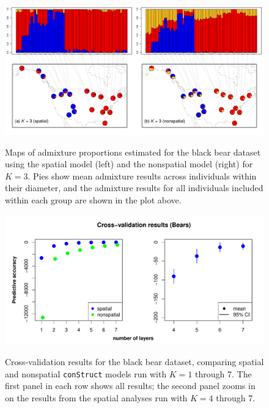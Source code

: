 \documentclass[10pt,letterpaper]{article}
\begin{document}
\begin{figure}
	\centering
		{\includegraphics[width=\textwidth]{figs/bears/bears_sp_vs_nsp.pdf}}
	\caption{
	Maps of admixture proportions estimated for the black bear dataset 
	using the spatial model (left) and the nonspatial model (right) for $K=3$.
	Pies show mean admixture results across individuals within their diameter, 
	and the admixture results for all individuals included within each group are 
	shown in the plot above.
    }\label{bear_K3}
\end{figure}

\begin{figure}
	\centering
		{\includegraphics[width=\textwidth]{figs/bears/bear_std_xval.pdf}}
	\caption{
	Cross-validation results for the black bear dataset,
	comparing spatial and nonspatial \texttt{conStruct} models run with $K=1$ through 7.  
	The first panel in each row shows all results; 
	the second panel zooms in on the results from the spatial analyses run with $K = 4$ through 7.
    }\label{bear_xvals}
\end{figure}
\end{document}
